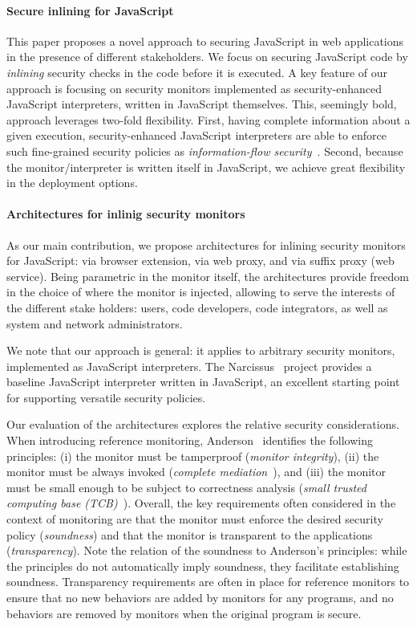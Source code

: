 \documentclass{llncs}
\begin{document}
\paragraph{Secure inlining for JavaScript}
This paper proposes a novel approach to securing JavaScript in web
applications in the presence of different stakeholders.
%
We focus on securing JavaScript code by \emph{inlining}
security checks in the code before it is executed.
%
A key feature
of our approach is focusing on security monitors implemented as
security-enhanced JavaScript interpreters, written in JavaScript
themselves. This, seemingly bold, approach leverages two-fold
flexibility. First, having complete information about a given
execution, security-enhanced JavaScript interpreters are able to
enforce such fine-grained security policies as \emph{information-flow
security}~\cite{Sabelfeld:Myers:JSAC}. Second, because the monitor/interpreter is written itself in
JavaScript, we achieve great flexibility in the deployment options.

\paragraph{Architectures for inlinig security monitors}
As our main contribution,
we propose architectures for inlining security monitors for JavaScript: via
browser extension, via web proxy, and via suffix proxy (web service). 
%
Being parametric in the monitor itself,
the architectures provide freedom in the choice of where the monitor is
injected, allowing to serve the interests of the different stake
holders: users, code developers, code
integrators, as well as system and network administrators.

We note that our approach is general: it applies to arbitrary security
monitors, implemented as JavaScript interpreters. The 
 Narcissus~\cite{Narcissus} project provides a baseline JavaScript
 interpreter written in JavaScript, an excellent starting
 point for supporting versatile security policies.

Our evaluation of the architectures explores the relative security
considerations.
When introducing reference monitoring, Anderson~\cite{Anderson:72}
identifies the following principles:
(i) the monitor must be tamperproof (\emph{monitor integrity}),
(ii) the monitor must be always invoked (\emph{complete
  mediation}~\cite{Saltzer:Schroeder:TCB}), and
(iii) the monitor must be small enough to be subject to correctness
analysis (\emph{small trusted computing base
  (TCB)}~\cite{Saltzer:Schroeder:TCB,DBLP:dblp_conf/sosp/Rushby81}). Overall,
the key requirements often considered in the context of monitoring are 
that the monitor must enforce the desired security policy
(\emph{soundness}) and that the monitor is transparent to the
applications (\emph{transparency}). Note the relation of
the soundness to Anderson's principles: while the principles do not
automatically imply soundness, they facilitate establishing soundness. 
Transparency requirements are often in place for reference monitors to
ensure that no new behaviors are added by monitors for any programs, and no
behaviors are removed by monitors when the
original program is secure.
\end{document}
